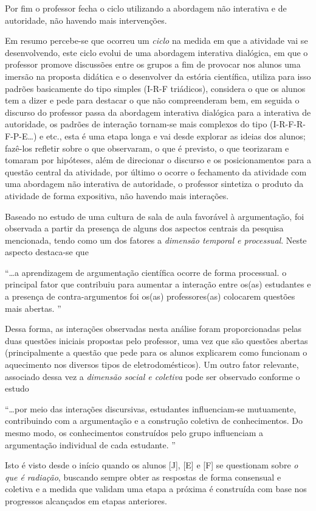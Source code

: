 Por fim o professor fecha o ciclo utilizando a abordagem não interativa e de autoridade, não havendo mais intervenções.

Em resumo percebe-se que ocorreu um \emph{ciclo} na medida em que a atividade vai se desenvolvendo, este ciclo evolui de uma abordagem interativa dialógica, em que o professor promove discussões entre os grupos a fim de provocar nos alunos uma imersão na proposta didática e o desenvolver da estória científica, utiliza para isso padrões basicamente do tipo simples (I-R-F triádicos), considera o que os alunos tem a dizer e pede para destacar o que não compreenderam bem, em seguida o discurso do professor passa da abordagem interativa dialógica para a interativa de autoridade, os padrões de interação tornam-se mais complexos do tipo (I-R-F-R-F-P-E\ldots) e etc., esta é uma etapa longa e vai desde explorar as ideias dos alunos; fazê-los refletir sobre o que observaram, o que é previsto, o que teorizaram e tomaram por hipóteses, além de direcionar o discurso e os posicionamentos para a questão central da atividade, por último o ocorre o fechamento da atividade com uma abordagem não interativa de autoridade, o professor sintetiza o produto da atividade de forma expositiva, não havendo mais interações.

Baseado no estudo de \cite{TELES:2021} uma cultura de sala de aula favorável à argumentação, foi observada a partir da presença de alguns dos aspectos centrais da pesquisa mencionada, tendo como um dos fatores a \emph{dimensão temporal e processual}. Neste aspecto destaca-se que
\begin{citacao}
    ``\ldots a aprendizagem de argumentação científica ocorre de forma processual. o principal fator que contribuiu para aumentar a interação entre os(as) estudantes e a presença de contra-argumentos foi os(as) professores(as) colocarem questões mais abertas. ''
\end{citacao}
Dessa forma, as interações observadas nesta análise foram proporcionadas pelas duas questões iniciais propostas pelo professor, uma vez que são questões abertas (principalmente a questão que pede para os alunos explicarem como funcionam o aquecimento nos diversos tipos de eletrodomésticos).
Um outro fator relevante, associado dessa vez a \emph{dimensão social e coletiva} pode ser observado conforme o estudo
\begin{citacao}
    ``\ldots por meio das interações discursivas, estudantes influenciam-se mutuamente, contribuindo com a argumentação e a construção coletiva de conhecimentos. Do mesmo modo, os conhecimentos construídos pelo grupo influenciam a argumentação individual de cada estudante. ''
\end{citacao}
Isto é visto desde o início quando os alunos [J], [E] e [F] se questionam sobre \emph{o que é radiação}, buscando sempre obter as respostas de forma consensual e coletiva e a medida que validam uma etapa a próxima é construída com base nos progressos alcançados em etapas anteriores.

